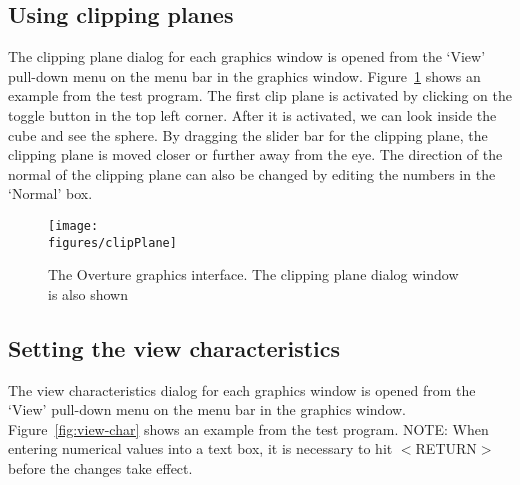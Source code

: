\subsection{Using clipping planes}
The clipping plane dialog for each graphics window is opened from the
`View' pull-down menu on the menu bar in the graphics
window. Figure~\protect\ref{fig:clip-plane} shows an example from the test
program. The first clip plane is activated by clicking on the toggle
button in the top left corner. After it is activated, we can look
inside the cube and see the sphere. By dragging the slider bar for the
clipping plane, the clipping plane is moved closer or further away
from the eye. The direction of the normal of the clipping plane can
also be changed by editing the numbers in the `Normal' box.
\begin{figure}
  \begin{center}
     \texttt{[image: \\figures/clipPlane]}
  \caption{The Overture graphics interface. The clipping plane dialog window is also shown}\label{fig:clip-plane}
  \end{center}
\end{figure}

\subsection{Setting the view characteristics} \label{sec:view-characteristics}
The view characteristics dialog for each graphics window is opened
from the `View' pull-down menu on the menu bar in the graphics
window. Figure~\protect\ref{fig:view-char} shows an example from the test
program. NOTE: When entering numerical values into a text box, it is
necessary to hit $<$RETURN$>$ before the changes take effect.

